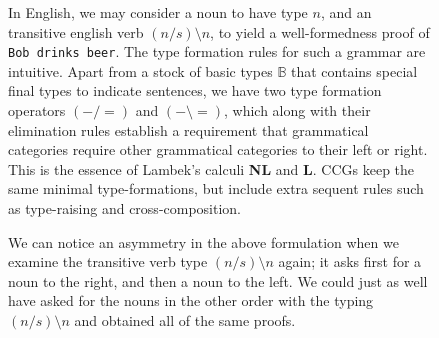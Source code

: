 \begin{figure}[h!]
\centering
{}
\caption{In English, we may consider a noun to have type $n$, and an transitive english verb $(n/s)\setminus n$, to yield a well-formedness proof of \texttt{Bob drinks beer}. The type formation rules for such a grammar are intuitive. Apart from a stock of basic types $\mathbb{B}$ that contains special final types to indicate sentences, we have two type formation operators $(-/=)$ and $(- \setminus =)$, which along with their elimination rules establish a requirement that grammatical categories require other grammatical categories to their left or right. This is the essence of Lambek's calculi \textbf{NL} and \textbf{L}. CCGs keep the same minimal type-formations, but include extra sequent rules such as type-raising and cross-composition.}
\end{figure}

\begin{figure}[h!]
\centering
{}
\caption{We can notice an asymmetry in the above formulation when we examine the transitive verb type $(n/s)\setminus n$ again; it asks first for a noun to the right, and then a noun to the left. We could just as well have asked for the nouns in the other order with the typing $(n/s)\setminus n$ and obtained all of the same proofs.}
\end{figure}


